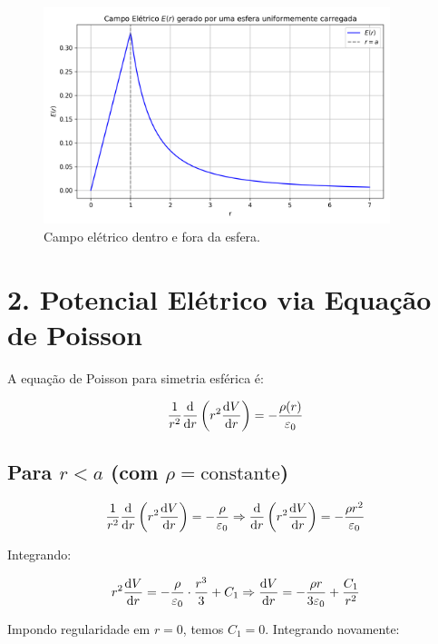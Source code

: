 \documentclass[a4paper,12pt]{article}
\begin{document}
\begin{flushleft}
\begin{figure}[h]
\centering
\includegraphics[width=0.9\textwidth]{plots/campo_eletrico_esfera.png} %
\caption{Campo elétrico dentro e fora da esfera.}
\end{figure}

\newpage
\section*{2. Potencial Elétrico via Equação de Poisson}

A \colorbox{green!15}{equação de Poisson para simetria esférica é:}

\begin{equation}
\frac{1}{r^2} \dv{r} \left( r^2 \dv{V}{r} \right) = -\frac{\rho(r)}{\varepsilon_0}
\end{equation}

\subsection*{Para \( r < a \) (com \( \rho = \text{constante} \))}

\begin{equation}
\frac{1}{r^2} \dv{r} \left( r^2 \dv{V}{r} \right) = -\frac{\rho}{\varepsilon_0}
\Rightarrow \dv{r} \left( r^2 \dv{V}{r} \right) = -\frac{\rho r^2}{\varepsilon_0}
\end{equation}

Integrando:

\begin{equation}
r^2 \dv{V}{r} = -\frac{\rho}{\varepsilon_0} \cdot \frac{r^3}{3} + C_1
\Rightarrow \dv{V}{r} = -\frac{\rho r}{3\varepsilon_0} + \frac{C_1}{r^2}
\end{equation}

Impondo regularidade em \( r = 0 \), temos \( C_1 = 0 \). Integrando novamente:


\end{flushleft}
\end{document}
